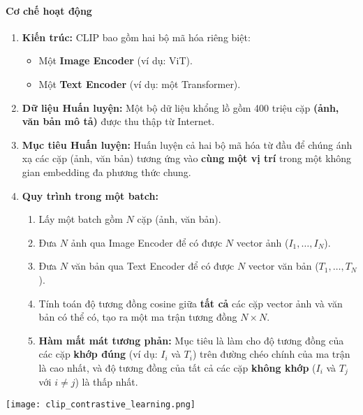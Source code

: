 \paragraph{Cơ chế hoạt động}
\begin{enumerate}
    \item \textbf{Kiến trúc:} CLIP bao gồm hai bộ mã hóa riêng biệt:
        \begin{itemize}
            \item Một \textbf{Image Encoder} (ví dụ: ViT).
            \item Một \textbf{Text Encoder} (ví dụ: một Transformer).
        \end{itemize}
    \item \textbf{Dữ liệu Huấn luyện:} Một bộ dữ liệu khổng lồ gồm 400 triệu cặp \textbf{(ảnh, văn bản mô tả)} được thu thập từ Internet.
    \item \textbf{Mục tiêu Huấn luyện:} Huấn luyện cả hai bộ mã hóa từ đầu để chúng ánh xạ các cặp (ảnh, văn bản) tương ứng vào \textbf{cùng một vị trí} trong một không gian embedding đa phương thức chung.
    \item \textbf{Quy trình trong một batch:}
        \begin{enumerate}
            \item Lấy một batch gồm $N$ cặp (ảnh, văn bản).
            \item Đưa $N$ ảnh qua Image Encoder để có được $N$ vector ảnh ($I_1, \dots, I_N$).
            \item Đưa $N$ văn bản qua Text Encoder để có được $N$ vector văn bản ($T_1, \dots, T_N$).
            \item Tính toán độ tương đồng cosine giữa \textbf{tất cả} các cặp vector ảnh và văn bản có thể có, tạo ra một ma trận tương đồng $N \times N$.
            \item \textbf{Hàm mất mát tương phản:} Mục tiêu là làm cho độ tương đồng của các cặp \textbf{khớp đúng} (ví dụ: $I_i$ và $T_i$) trên đường chéo chính của ma trận là cao nhất, và độ tương đồng của tất cả các cặp \textbf{không khớp} ($I_i$ và $T_j$ với $i \neq j$) là thấp nhất.
        \end{enumerate}
\end{enumerate}

\begin{center}
    \texttt{[image: clip\_contrastive\_learning.png]}
    \label{fig:clip_contrastive_learning}
\end{center}


